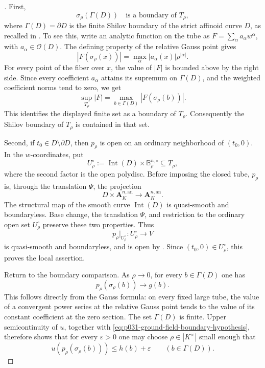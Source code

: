 \begin{proof}[
]
First,
\begin{equation}
\label{eq:p031-relative-gauss-boundary}
                  \sigma_\rho(\Gamma(D))
                  \quad\text{is a boundary of }T_\rho,
\end{equation}
where $\Gamma(D)=\partial D$ is the finite Shilov boundary of the strict
affinoid curve $D$, as recalled in
\cite[\S3.1(3)]{GR25Classical}.  To see this, write an analytic function on
the tube as $F=\sum_{\alpha}a_\alpha w^\alpha$, with
$a_\alpha\in\mathcal O(D)$.  The defining property of the relative
Gauss point gives
\[
 |F(\sigma_\rho(x))|
        =\max_\alpha |a_\alpha(x)|\rho^{|\alpha|}.
\]
For every point of the fiber over $x$, the value of $|F|$ is bounded
above by the right side.  Since every coefficient $a_\alpha$ attains its
supremum on $\Gamma(D)$, and the weighted coefficient norms tend to
zero, we get
\[
 \sup_{T_\rho}|F|
   =\max_{b\in\Gamma(D)}|F(\sigma_\rho(b))|.
\]
This identifies the displayed finite set as a boundary of $T_\rho$.
Consequently the Shilov boundary of $T_\rho$ is contained in that set.

Second, if $t_0\in D\setminus\partial D$, then $p_\rho$ is open on an
ordinary neighborhood of $(t_0,0)$.  In the $w$-coordinates, put
\[
 U_\rho^\circ
    :=\operatorname{Int}(D)\times\mathbb B_{\rho}^{n,\circ}
       \subseteq T_\rho,
\]
where the second factor is the open polydisc.  Before imposing the closed
tube, $p_\rho$ is, through the translation $\Psi$, the projection
\[
             D\times\mathbf A_K^{n,\mathrm{an}}
                     \longrightarrow\mathbf A_K^{n,\mathrm{an}}.
\]
The structural map of the smooth curve $\operatorname{Int}(D)$ is
quasi-smooth and boundaryless.  Base change, the translation $\Psi$, and
restriction to the ordinary open set $U_\rho^\circ$ preserve these two
properties.  Thus
\[
                   p_\rho|_{U_\rho^\circ}:U_\rho^\circ\longrightarrow V
\]
is quasi-smooth and boundaryless, and is open by
\cite[Corollary~6.2.5]{Ducros18Families}.  Since
$(t_0,0)\in U_\rho^\circ$, this proves the local assertion.

Return to the boundary comparison.  As $\rho\to0$, for every
$b\in\Gamma(D)$ one has
\begin{equation}
\label{eq:p031-gauss-convergence}
                 p_\rho(\sigma_\rho(b))\longrightarrow g(b).
\end{equation}
This follows directly from the Gauss formula: on every fixed large tube,
the value of a convergent power series at the relative Gauss point tends
to the value of its constant coefficient at the zero section.  The set
$\Gamma(D)$ is finite.  Upper semicontinuity of $u$, together with
\eqref{eq:p031-ground-field-boundary-hypothesis}, therefore shows that for every
$\varepsilon>0$ one may choose $\rho\in|K^\times|$ small enough that
\begin{equation}
\label{eq:p031-gauss-bound}
 u(p_\rho(\sigma_\rho(b)))
       \leq h(b)+\varepsilon
       \qquad(b\in\Gamma(D)).
\end{equation}


\end{proof}

